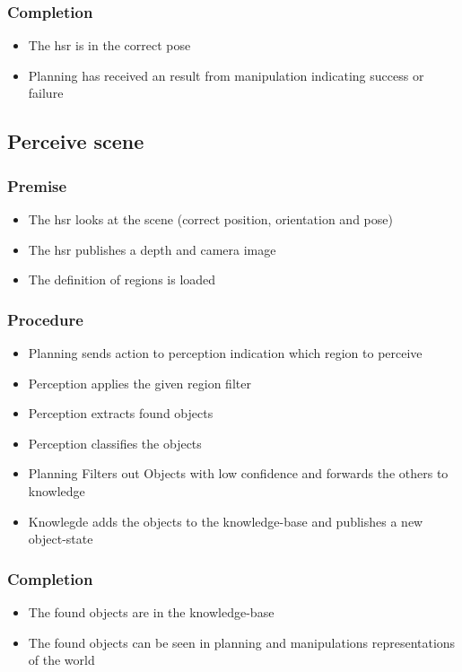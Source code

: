 \documentclass[main.tex]{subfiles}
\begin{document}
	\subsubsection{Completion}
	\begin{itemize}
		\item The hsr is in the correct pose
		\item Planning has received an result from manipulation indicating success or failure		
	\end{itemize}
	
	\subsection{Perceive scene} 
	
	\subsubsection{Premise}
	\begin{itemize}
		\item The hsr looks at the scene (correct position, orientation and pose)
		\item The hsr publishes a depth and camera image
		\item The definition of regions is loaded 
	\end{itemize} 
	
	\subsubsection{Procedure}
	\begin{itemize}			
		\item Planning sends action to perception indication which region to perceive
		\item Perception applies the given region filter
		\item Perception extracts found objects
		\item Perception classifies the objects	
		\item Planning Filters out Objects with low confidence and forwards the others to knowledge
		\item Knowlegde adds the objects to the knowledge-base and publishes a new object-state			
	\end{itemize}
	
	\subsubsection{Completion}
	\begin{itemize}
		\item The found objects are in the knowledge-base
		\item The found objects can be seen in planning and manipulations representations of the world 		
	\end{itemize}
	
\end{document}
